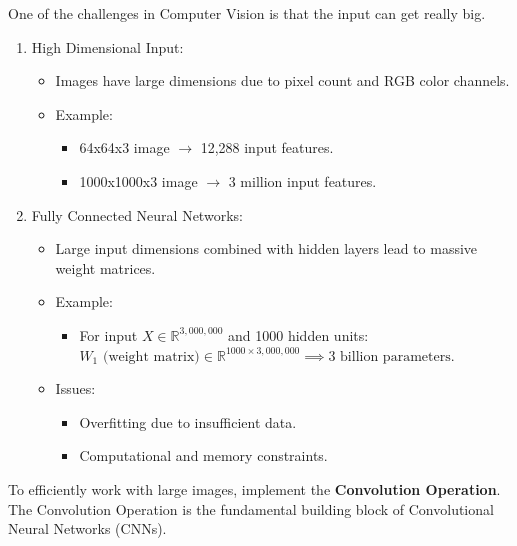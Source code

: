 \documentclass[letterpaper,12pt,notitlepage,twoside]{report}
\begin{document}
One of the challenges in Computer Vision is that the input can get really big.
\begin{enumerate}
    \item High Dimensional Input:
    \begin{itemize}
        \item Images have large dimensions due to pixel count and RGB color channels.
        \item Example:
        \begin{itemize}
            \item 64x64x3 image $\rightarrow$ 12,288 input features.
            \item 1000x1000x3 image $\rightarrow$ 3 million input features.
        \end{itemize}
    \end{itemize}

    \item Fully Connected Neural Networks:
    \begin{itemize}
        \item Large input dimensions combined with hidden layers lead to massive weight matrices.
        \item Example:
        \begin{itemize}
            \item For input $X \in \mathbb{R}^{3,000,000}$ and 1000 hidden units: \\
            $W_1 \text{ (weight matrix)} \in \mathbb{R}^{1000 \times 3,000,000} \implies \text{3 billion parameters}.$
        \end{itemize}
        \item Issues:
        \begin{itemize}
            \item Overfitting due to insufficient data.
            \item Computational and memory constraints.
        \end{itemize}
    \end{itemize}
\end{enumerate}

To efficiently work with large images, implement the \textbf{Convolution Operation}. The Convolution Operation is the fundamental building block of Convolutional Neural Networks (CNNs).

\end{document}

